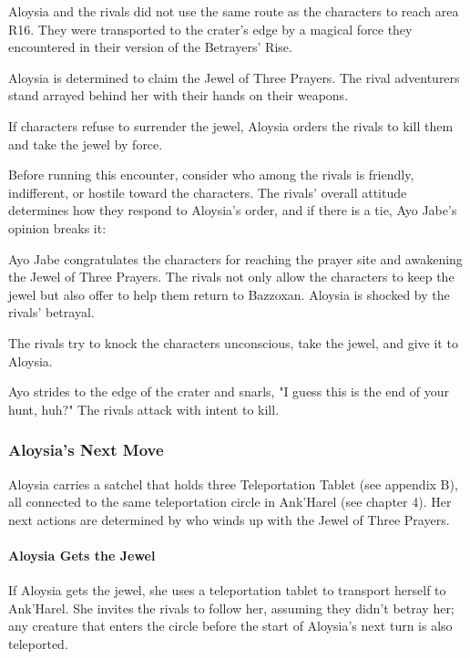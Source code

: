 \documentclass[10pt,a4paper,twoside,twocolumn,openany,nodeprecatedcode]{dndbook}
\begin{document}
Aloysia and the rivals did not use the same route as the characters to reach area R16. They were transported to the crater's edge by a magical force they encountered in their version of the Betrayers' Rise.

Aloysia is determined to claim the Jewel of Three Prayers. The rival adventurers stand arrayed behind her with their hands on their weapons.

If characters refuse to surrender the jewel, Aloysia orders the rivals to kill them and take the jewel by force.

Before running this encounter, consider who among the rivals is friendly, indifferent, or hostile toward the characters. The rivals' overall attitude determines how they respond to Aloysia's order, and if there is a tie, Ayo Jabe's opinion breaks it:


\begin{description}[nolistsep]
\item[Friendly Rivals.]
Ayo Jabe congratulates the characters for reaching the prayer site and awakening the Jewel of Three Prayers. The rivals not only allow the characters to keep the jewel but also offer to help them return to Bazzoxan. Aloysia is shocked by the rivals' betrayal.
\item[Indifferent Rivals.]
The rivals try to knock the characters unconscious, take the jewel, and give it to Aloysia.
\item[Hostile Rivals.]
Ayo strides to the edge of the crater and snarls, "I guess this is the end of your hunt, huh?" The rivals attack with intent to kill.
\end{description}

\subsubsection{Aloysia's Next Move}
Aloysia carries a satchel that holds three Teleportation Tablet (see appendix B), all connected to the same teleportation circle in Ank'Harel (see chapter 4). Her next actions are determined by who winds up with the Jewel of Three Prayers.

\paragraph{Aloysia Gets the Jewel}
If Aloysia gets the jewel, she uses a teleportation tablet to transport herself to Ank'Harel. She invites the rivals to follow her, assuming they didn't betray her; any creature that enters the circle before the start of Aloysia's next turn is also teleported.
\end{document}
